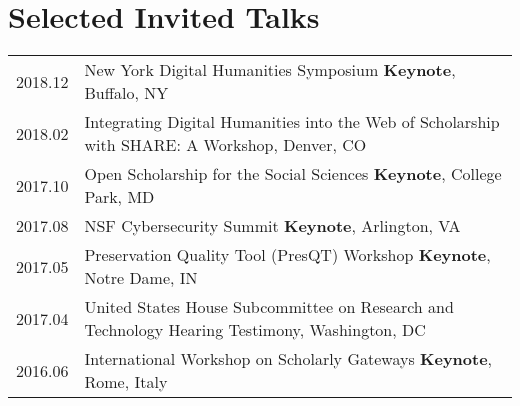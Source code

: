 \documentclass[11pt]{article}
\begin{document}
\section*{Selected Invited Talks}
\begin{tabularx}{\textwidth}{lX}
    2018.12     & New York Digital Humanities Symposium \textbf{Keynote}, Buffalo, NY\\
    2018.02     & Integrating Digital Humanities into the Web of Scholarship with SHARE: A Workshop, Denver, CO\\
    2017.10     & Open Scholarship for the Social Sciences \textbf{Keynote}, College Park, MD\\
    2017.08     & NSF Cybersecurity Summit \textbf{Keynote}, Arlington, VA \\ %
    2017.05     & Preservation Quality Tool (PresQT) Workshop \textbf{Keynote}, Notre Dame, IN\\%
    2017.04     & United States House Subcommittee on Research and Technology Hearing Testimony, Washington, DC\\ %
    2016.06     & International Workshop on Scholarly Gateways \textbf{Keynote}, Rome, Italy\\
\end{tabularx}
\end{document}
